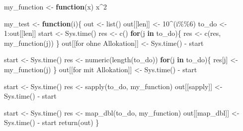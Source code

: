 \documentclass[
]{book}
\newenvironment{Shaded}{\begin{snugshade}}{\end{snugshade}}
\newcommand{\ControlFlowTok}[1]{\textcolor[rgb]{0.13,0.29,0.53}{\textbf{#1}}}
\newcommand{\DecValTok}[1]{\textcolor[rgb]{0.00,0.00,0.81}{#1}}
\newcommand{\FunctionTok}[1]{\textcolor[rgb]{0.00,0.00,0.00}{#1}}
\newcommand{\NormalTok}[1]{#1}
\newcommand{\OtherTok}[1]{\textcolor[rgb]{0.56,0.35,0.01}{#1}}
\newcommand{\SpecialCharTok}[1]{\textcolor[rgb]{0.00,0.00,0.00}{#1}}
\newcommand{\StringTok}[1]{\textcolor[rgb]{0.31,0.60,0.02}{#1}}
\begin{document}
\begin{Shaded}
\begin{Highlighting}[]
\NormalTok{my\_function }\OtherTok{\textless{}{-}} \ControlFlowTok{function}\NormalTok{(x) x}\SpecialCharTok{\^{}}\DecValTok{2}



\NormalTok{my\_test }\OtherTok{\textless{}{-}} \ControlFlowTok{function}\NormalTok{(i)\{}
\NormalTok{  out }\OtherTok{\textless{}{-}} \FunctionTok{list}\NormalTok{()}
\NormalTok{  out[[}\StringTok{\textquotesingle{}len\textquotesingle{}}\NormalTok{]] }\OtherTok{\textless{}{-}} \DecValTok{10}\SpecialCharTok{\^{}}\NormalTok{(i}\SpecialCharTok{\%\%}\DecValTok{6}\NormalTok{)}
\NormalTok{  to\_do }\OtherTok{\textless{}{-}} \DecValTok{1}\SpecialCharTok{:}\NormalTok{out[[}\StringTok{\textquotesingle{}len\textquotesingle{}}\NormalTok{]]}
\NormalTok{  start }\OtherTok{\textless{}{-}} \FunctionTok{Sys.time}\NormalTok{()}
\NormalTok{  res }\OtherTok{\textless{}{-}} \FunctionTok{c}\NormalTok{()}
  \ControlFlowTok{for}\NormalTok{(j }\ControlFlowTok{in}\NormalTok{ to\_do)\{}
\NormalTok{    res }\OtherTok{\textless{}{-}} \FunctionTok{c}\NormalTok{(res, }\FunctionTok{my\_function}\NormalTok{(j))}
\NormalTok{  \}}
\NormalTok{  out[[}\StringTok{\textquotesingle{}for ohne Allokation\textquotesingle{}}\NormalTok{]] }\OtherTok{\textless{}{-}} \FunctionTok{Sys.time}\NormalTok{() }\SpecialCharTok{{-}}\NormalTok{ start}
  
\NormalTok{  start }\OtherTok{\textless{}{-}} \FunctionTok{Sys.time}\NormalTok{()}
\NormalTok{  res }\OtherTok{\textless{}{-}} \FunctionTok{numeric}\NormalTok{(}\FunctionTok{length}\NormalTok{(to\_do))}
  \ControlFlowTok{for}\NormalTok{(j }\ControlFlowTok{in}\NormalTok{ to\_do)\{}
\NormalTok{    res[j] }\OtherTok{\textless{}{-}} \FunctionTok{my\_function}\NormalTok{(j)}
\NormalTok{  \}}
\NormalTok{  out[[}\StringTok{\textquotesingle{}for mit Allokation\textquotesingle{}}\NormalTok{]] }\OtherTok{\textless{}{-}} \FunctionTok{Sys.time}\NormalTok{() }\SpecialCharTok{{-}}\NormalTok{ start}
  
\NormalTok{  start }\OtherTok{\textless{}{-}} \FunctionTok{Sys.time}\NormalTok{()}
\NormalTok{  res }\OtherTok{\textless{}{-}} \FunctionTok{sapply}\NormalTok{(to\_do, my\_function)}
\NormalTok{  out[[}\StringTok{\textquotesingle{}sapply\textquotesingle{}}\NormalTok{]] }\OtherTok{\textless{}{-}} \FunctionTok{Sys.time}\NormalTok{() }\SpecialCharTok{{-}}\NormalTok{ start}
  
\NormalTok{  start }\OtherTok{\textless{}{-}} \FunctionTok{Sys.time}\NormalTok{()}
\NormalTok{  res }\OtherTok{\textless{}{-}} \FunctionTok{map\_dbl}\NormalTok{(to\_do, my\_function)}
\NormalTok{  out[[}\StringTok{\textquotesingle{}map\_dbl\textquotesingle{}}\NormalTok{]] }\OtherTok{\textless{}{-}} \FunctionTok{Sys.time}\NormalTok{() }\SpecialCharTok{{-}}\NormalTok{ start}
  \FunctionTok{return}\NormalTok{(out)}
\NormalTok{\}}
\end{Highlighting}
\end{Shaded}
\end{document}

